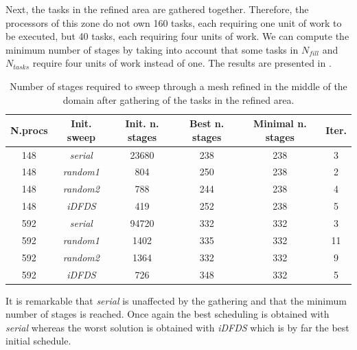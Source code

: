 \documentclass[letterpaper]{article}
\renewcommand{\(}{\left(}
\renewcommand{\)}{\right)}
\renewcommand{\[}{\left[}
\renewcommand{\]}{\right]}
\begin{document}
Next, the tasks in the refined area are gathered together. Therefore, the
processors of this zone do not own 160 tasks, each requiring one unit of work to
be executed, but 40 tasks, each requiring four units of work. We
can compute the minimum number of stages by taking into account that some tasks
in $N_{fill}$ and $N_{tasks}$ require four units of work instead of one. The
results are presented in .
\begin{table}[H]
  \begin{center}
    \begin{tabular}{|c|c|c|c|c|c|}
      \hline
      N.procs & Init. sweep & Init. n. stages & Best n. stages & Minimal n. stages & Iter. \\
      \hline
      148 &  \emph{serial} & 23680 & 238 & 238 &  3 \\
      148 & \emph{random1} &   804 & 250 & 238 &  2 \\
      148 & \emph{random2} &   788 & 244 & 238 &  4 \\
      148 &   \emph{iDFDS} &   419 & 252 & 238 &  5 \\
      592 &  \emph{serial} & 94720 & 332 & 332 &  3 \\
      592 & \emph{random1} &  1402 & 335 & 332 & 11 \\
      592 & \emph{random2} &  1364 & 332 & 332 &  9 \\
      592 &   \emph{iDFDS} &   726 & 348 & 332 &  5 \\
      \hline
    \end{tabular}
    \caption{Number of stages required to sweep through a mesh refined in the
      middle of the domain after gathering of the tasks in the refined area.}
    \label{amr_2}
  \end{center}
\end{table}

It is remarkable that \emph{serial} is unaffected by the gathering and that the
minimum number of stages is reached. Once again the best scheduling is obtained
with \emph{serial} whereas the worst solution is obtained with \emph{iDFDS}
which is by far the best initial schedule.
\end{document}
